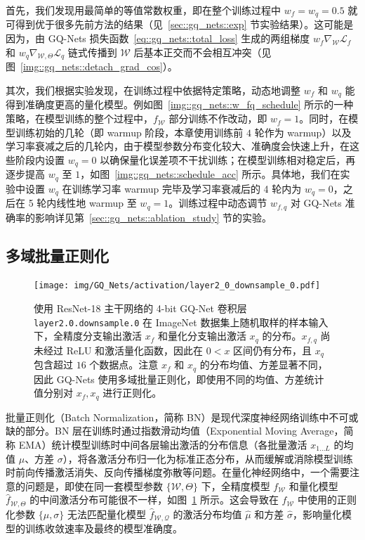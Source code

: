 \documentclass[
  fontset = mac,
]{shtthesis}
\providecommand{\FpNet}{f_{\mathcal{W}}}
\providecommand{\QuantNet}{\hat{f}_{\mathcal{W, Q}}}
\begin{document}
首先，我们发现用最简单的等值常数权重，即在整个训练过程中 $w_f = w_q = 0.5$ 就可得到优于很多先前方法的结果（见~\ref{sec::gq_nets::exp} 节实验结果）。这可能是因为，由 GQ-Nets 损失函数~\eqref{eq::gq_nets::total_loss} 生成的两组梯度 $w_f \nabla_{\mathcal{W}}\mathcal{L}_f$ 和 $w_q \nabla_{\mathcal{W}, \Theta}\mathcal{L}_q$ 链式传播到 $\mathcal{W}$ 后基本正交而不会相互冲突（见图~\ref{img::gq_nets::detach_grad_cos}）。

其次，我们根据实验发现，在训练过程中依据特定策略，动态地调整 $w_f$ 和 $w_q$ 能得到准确度更高的量化模型。例如图~\ref{img::gq_nets::w_fq_schedule} 所示的一种策略，在模型训练的整个过程中，$f_{\mathcal{W}}$ 部分训练不作改动，即 $w_f = 1$。同时，在模型训练初始的几轮（即 warmup 阶段，本章使用训练前 $4$ 轮作为 warmup）以及学习率衰减之后的几轮内，由于模型参数分布变化较大、准确度会快速上升，在这些阶段内设置 $w_q = 0$ 以确保量化误差项不干扰训练；在模型训练相对稳定后，再逐步提高 $w_q$ 至 $1$，如图~\ref{img::gq_nets::schedule_acc} 所示。具体地，我们在实验中设置 $w_q$ 在训练学习率 warmup 完毕及学习率衰减后的 4 轮内为 $w_q = 0$，之后在 5 轮内线性地 warmup 至 $w_q = 1$。训练过程中动态调节 $w_{f, q}$ 对 GQ-Nets 准确率的影响详见第~\ref{sec::gq_nets::ablation_study} 节的实验。
\subsection{多域批量正则化}

\begin{figure}[htb]
  \centering
  \texttt{[image: img/GQ\_Nets/activation/layer2\_0\_downsample\_0.pdf]}
  \caption{使用 ResNet-18 主干网络的 4-bit GQ-Net 卷积层 \texttt{layer2.0.downsample.0} 在 ImageNet 数据集上随机取样的样本输入下，全精度分支输出激活 $x_f$ 和量化分支输出激活 $x_q$ 的分布。$x_{f, q}$ 尚未经过 ReLU 和激活量化函数，因此在 $0 < x$ 区间仍有分布，且 $x_q$ 包含超过 $16$ 个数据点。注意 $x_f$ 和 $x_q$ 的分布均值、方差显著不同，因此 GQ-Nets 使用多域批量正则化，即使用不同的均值、方差统计值分别对 $x_f, x_q$ 进行正则化。}
  \label{img::gq_nets::fp_q_act_dist}
\end{figure}

批量正则化（Batch Normalization，简称 BN）是现代深度神经网络训练中不可或缺的部分。BN 层在训练时通过指数滑动均值（Exponential Moving Average，简称 EMA）统计模型训练时中间各层输出激活的分布信息（各批量激活 $x_{1\ldots L}$ 的均值 $\mu$、方差 $\sigma$），将各激活分布归一化为标准正态分布，从而缓解或消除模型训练时前向传播激活消失、反向传播梯度弥散等问题。在量化神经网络中，一个需要注意的问题是，即使在同一套模型参数 $\{\mathcal{W}, \Theta\}$ 下，全精度模型 $f_{\mathcal{W}}$ 和量化模型 $\hat{f}_{\mathcal{W}, \Theta}$ 的中间激活分布可能很不一样，如图~\ref{img::gq_nets::fp_q_act_dist} 所示。这会导致在 $\FpNet$ 中使用的正则化参数 $\{\mu, \sigma\}$ 无法匹配量化模型 $\QuantNet$ 的激活分布均值 $\hat{\mu}$ 和方差 $\hat{\sigma}$，影响量化模型的训练收敛速率及最终的模型准确度。
\end{document}
